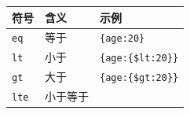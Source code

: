 \documentclass[]{ctexbook}
\begin{document}
\begin{longtable}[]{@{}lll@{}}
\toprule
\begin{minipage}[b]{0.13\columnwidth}\raggedright
符号\strut
\end{minipage} & \begin{minipage}[b]{0.26\columnwidth}\raggedright
含义\strut
\end{minipage} & \begin{minipage}[b]{0.53\columnwidth}\raggedright
示例\strut
\end{minipage}\tabularnewline
\midrule
\endhead
\begin{minipage}[t]{0.13\columnwidth}\raggedright
\texttt{eq}\strut
\end{minipage} & \begin{minipage}[t]{0.26\columnwidth}\raggedright
等于\strut
\end{minipage} & \begin{minipage}[t]{0.53\columnwidth}\raggedright
\texttt{\{\textquotesingle{}age\textquotesingle{}:20\}}\strut
\end{minipage}\tabularnewline
\begin{minipage}[t]{0.13\columnwidth}\raggedright
\texttt{lt}\strut
\end{minipage} & \begin{minipage}[t]{0.26\columnwidth}\raggedright
小于\strut
\end{minipage} & \begin{minipage}[t]{0.53\columnwidth}\raggedright
\texttt{\{\textquotesingle{}age\textquotesingle{}:\{\textquotesingle{}\$lt\textquotesingle{}:20\}\}}\strut
\end{minipage}\tabularnewline
\begin{minipage}[t]{0.13\columnwidth}\raggedright
\texttt{gt}\strut
\end{minipage} & \begin{minipage}[t]{0.26\columnwidth}\raggedright
大于\strut
\end{minipage} & \begin{minipage}[t]{0.53\columnwidth}\raggedright
\texttt{\{\textquotesingle{}age\textquotesingle{}:\{\textquotesingle{}\$gt\textquotesingle{}:20\}\}}\strut
\end{minipage}\tabularnewline
\begin{minipage}[t]{0.13\columnwidth}\raggedright
\texttt{lte}\strut
\end{minipage} & \begin{minipage}[t]{0.26\columnwidth}\raggedright
小于等于\strut
\end{minipage} & \begin{minipage}[t]{0.53\columnwidth}\raggedright

\end{minipage}
\end{longtable}
\end{document}
